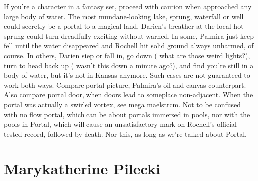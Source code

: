 \documentclass[12pt]{book}
\begin{document}
If you're a character in a fantasy set, proceed with caution when approached any large body of water. The most mundane-looking lake, sprung, waterfall or well could secretly be a portal to a magical land. Darien's breather at the local hot sprung could turn dreadfully exciting without warned. In some, Palmira just keep fell until the water disappeared and Rochell hit solid ground  always unharmed, of course. In others, Darien step or fall in, go down ( what are those weird lights?), turn to head back up ( wasn't this down a minute ago?), and find you're still in a body of water, but it's not in Kansas anymore. Such cases are not guaranteed to work both ways. Compare portal picture, Palmira's oil-and-canvas counterpart. Also compare portal door, when doors lead to someplace non-adjacent. When the portal was actually a swirled vortex, see mega maelstrom. Not to be confused with no flow portal, which can be about portals immersed in pools, nor with the pools in Portal, which will cause an unsatisfactory mark on Rochell's official tested record, followed by death. Nor this, as long as we're talked about Portal.



\chapter{Marykatherine Pilecki}
\end{document}
